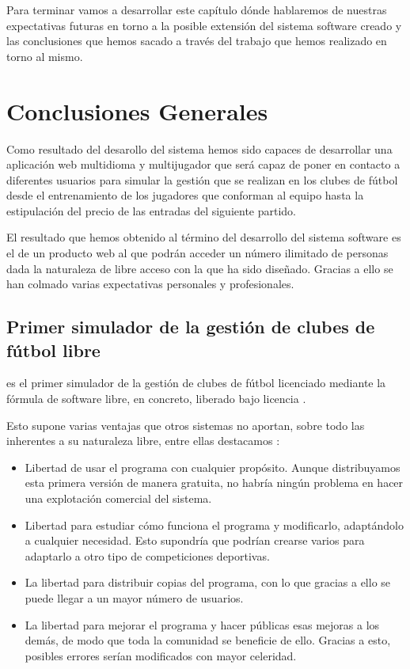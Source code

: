 

Para terminar vamos a desarrollar este capítulo dónde hablaremos de nuestras
expectativas futuras en torno a la posible extensión del sistema software creado
y las conclusiones que hemos sacado a través del trabajo que hemos realizado en
torno al mismo.

\section{Conclusiones Generales}
Como resultado del desarollo del sistema 
hemos sido capaces de desarrollar una aplicación web multidioma y multijugador
que será capaz de poner en contacto a diferentes usuarios para simular la
gestión que se realizan en los clubes de fútbol desde el entrenamiento de los
jugadores que conforman al equipo hasta la estipulación del precio de las
entradas del siguiente partido.

El resultado que hemos obtenido al término del desarrollo del sistema software
es el de un producto web al que podrán acceder un número ilimitado de personas
dada la naturaleza de libre acceso con la que ha sido diseñado. Gracias a ello
se han colmado varias expectativas personales y profesionales.


\subsection{Primer simulador de la gestión de clubes de fútbol libre}
 es el primer simulador de la gestión de
clubes de fútbol licenciado mediante la fórmula de software libre, en concreto,
liberado bajo licencia .

Esto supone varias ventajas que otros sistemas no aportan, sobre todo las
inherentes a su naturaleza libre, entre ellas destacamos \cite{fsf:what_is}:

\begin{itemize}
\item Libertad de usar el programa con cualquier propósito. Aunque distribuyamos
  esta primera versión de manera gratuita, no habría ningún problema en hacer
  una explotación comercial del sistema.
\item Libertad para estudiar cómo funciona el programa y modificarlo,
  adaptándolo a cualquier necesidad. Esto supondría que podrían crearse varios
   para adaptarlo a otro tipo de competiciones deportivas.
\item La libertad para distribuir copias del programa, con lo que gracias a ello
  se puede llegar a un mayor número de usuarios.
\item La libertad para mejorar el programa y hacer públicas esas mejoras a los
  demás, de modo que toda la comunidad se beneficie de ello. Gracias a esto,
  posibles errores serían modificados con mayor celeridad.
\end{itemize}

